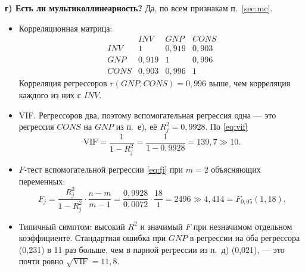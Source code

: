 \begin{solution}
\medskip
\textbf{г) Есть ли мультиколлинеарность?} Да, по всем признакам
п.~\ref{sec:mc}.
\begin{itemize}[leftmargin=2.2em, itemsep=2pt]
  \item Корреляционная матрица:
        \[
          \begin{array}{l|ccc}
                          & \mathit{INV} & \mathit{GNP} & \mathit{CONS} \\ \hline
            \mathit{INV}  & 1       & 0{,}919 & 0{,}903 \\
            \mathit{GNP}  & 0{,}919 & 1       & 0{,}996 \\
            \mathit{CONS} & 0{,}903 & 0{,}996 & 1
          \end{array}
        \]
        Корреляция регрессоров $r(\mathit{GNP}, \mathit{CONS}) = 0{,}996$ выше,
        чем корреляция каждого из них с $\mathit{INV}$.
  \item VIF. Регрессоров два, поэтому вспомогательная регрессия одна — это
        регрессия $\mathit{CONS}$ на $\mathit{GNP}$ из п.~е), её
        $R_j^2 = 0{,}9928$. По \eqref{eq:vif}
        \[
          \mathrm{VIF} = \frac{1}{1 - R_j^2} = \frac{1}{1 - 0{,}9928} = 139{,}7 \gg 10 .
        \]
  \item $F$-тест вспомогательной регрессии \eqref{eq:fj} при $m = 2$
        объясняющих переменных:
        \[
          F_j = \frac{R_j^2}{1 - R_j^2}\cdot\frac{n-m}{m-1}
              = \frac{0{,}9928}{0{,}0072}\cdot\frac{18}{1}
              = 2496 \gg 4{,}414 = F_{0{,}05}(1, 18).
        \]
  \item Типичный симптом: высокий $R^2$ и значимый $F$ при незначимом
        отдельном коэффициенте. Стандартная ошибка при $\mathit{GNP}$ в
        регрессии на оба регрессора (0,231) в 11 раз больше, чем в парной
        регрессии из п.~д) (0,021), — это почти ровно
        $\sqrt{\mathrm{VIF}} = 11{,}8$.
\end{itemize}


\end{solution}

